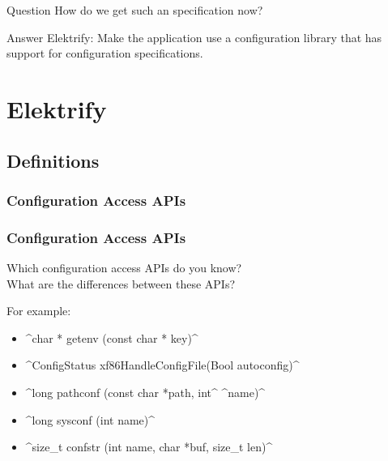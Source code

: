 \begin{frame}
	\begin{alertblock}{Question}
	How do we get such an specification now?
	\end{alertblock}

	\pause
	\begin{exampleblock}{Answer}
	Elektrify: Make the application use a configuration library that has support for configuration specifications.
	\end{exampleblock}
\end{frame}





\section{Elektrify}



\subsection{Definitions}

\begin{frame}
	\frametitle{Configuration Access APIs}

	\Large

\end{frame}

\begin{frame}[fragile]
	\frametitle{Configuration Access APIs}

	\begin{task}
	Which configuration access APIs do you know? \\
	What are the differences between these APIs?
	\end{task}

	\pause
	For example:
	\begin{itemize}[<+-| alert@+>]
	\item ^char * getenv (const char * key)^
	\item ^ConfigStatus xf86HandleConfigFile(Bool autoconfig)^
	\item ^long pathconf (const char *path, int^ ^name)^
	\item ^long sysconf (int name)^
	\item ^size_t confstr (int name, char *buf, size_t len)^
	\end{itemize}
\end{frame}

